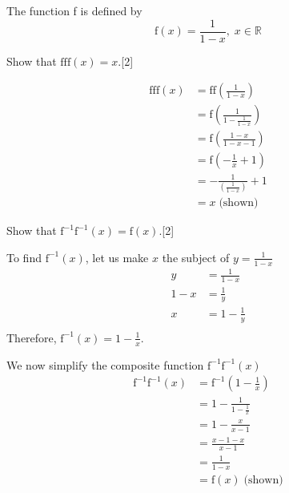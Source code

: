 \documentclass[12pt, a4 paper]{article}
\begin{document}
\begin{outline}[enumerate]
 \1 The function f is defined by \[\textrm{f}(x)=\frac{1}{1-x},\;x\in \mathbb{R}\]

 \2 Show that \(\textrm{f}\textrm{f}\textrm{f}(x)=x\).\hfill[2]
 \begin{answer}
  \begin{align*}
   \textrm{f}\textrm{f}\textrm{f}(x) & =\textrm{f}\textrm{f}\left(\frac{1}{1-x}\right)    \\
                                     & = \textrm{f}\left(\frac{1}{1-\frac{1}{1-x}}\right) \\
                                     & = \textrm{f}\left(\frac{1-x}{1-x-1}\right)         \\
                                     & = \textrm{f}\left(-\frac{1}{x}+1\right)            \\
                                     & = -\frac{1}{(\frac{1}{1-x})}+1                     \\
                                     & = x\;\textrm{(shown)}
  \end{align*}
 \end{answer}
 \2 Show that \(\textrm{f}^{-1}\textrm{f}^{-1}(x)=\textrm{f}(x)\).\hfill[2]
 \begin{answer}
  To find \(\textrm{f}^{-1}(x)\), let us make \(x\) the subject of \(y=\frac{1}{1-x}\)
  \begin{align*}
   y   & = \frac{1}{1-x}   \\
   1-x & = \frac{1}{y}     \\
   x   & = 1 - \frac{1}{y} \\
  \end{align*}
  Therefore, \(\textrm{f}^{-1}(x) = 1 - \frac{1}{x}\).
 \end{answer}
 \begin{answer}
  We now simplify the composite function \(\textrm{f}^{-1}\textrm{f}^{-1}(x)\)
  \begin{align*}
   \textrm{f}^{-1}\textrm{f}^{-1}(x) & = \textrm{f}^{-1}(1 - \frac{1}{x}) \\
                                     & = 1 - \frac{1}{1 - \frac{1}{x}}    \\
                                     & = 1 - \frac{x}{x-1}                \\
                                     & = \frac{x-1-x}{x-1}                \\
                                     & = \frac{1}{1-x}                    \\
                                     & = \textrm{f}(x)\;\textrm{(shown)}

\end{align*}
\end{answer}
\end{outline}
\end{document}
